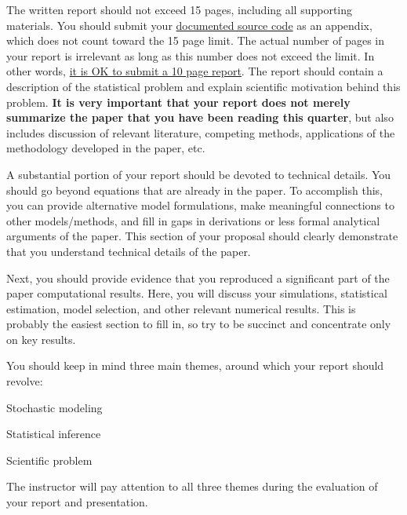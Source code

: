 \documentclass[12pt]{article} %
\newenvironment{itemize*}%
  {\begin{itemize}%
    \setlength{\itemsep}{0.01cm}%
    \setlength{\parskip}{0.02cm}%
    \setlength{\abovedisplayskip}{-0.12cm}%
    \setlength{\belowdisplayskip}{-0.12cm}}%
  {\end{itemize}}
\begin{document}
\par
The written report should not exceed 15 pages, including all supporting materials. You should 
submit your \underline{documented source code} as an appendix, 
which does not count toward the 15 page limit.
The actual number of pages in your report is irrelevant as long as this number does not exceed the 
limit. In other words, \underline{it is OK to submit a 10 page report}. 
The report should contain a description of the statistical problem and explain
scientific motivation behind this problem. \textbf{It is very important that your report does not merely
summarize the paper that you have been reading this quarter}, but also includes discussion of relevant
literature, competing methods, applications of the methodology developed in the paper, etc. 
\par
A substantial portion of your report should be devoted to technical details. You should go beyond 
equations that are already in the paper. To accomplish this, you can provide alternative model 
formulations, make meaningful connections to other models/methods, and fill in gaps in derivations or 
less formal analytical arguments of the paper. This section of your proposal should clearly demonstrate
that you understand technical details of the paper.
\par
Next, you should provide evidence that you reproduced a significant part of the paper computational
results. Here, you will discuss your simulations, statistical estimation, model selection, and 
other relevant numerical results. This is probably the easiest section to fill in, so try to be 
succinct and concentrate only on key results.
\vspace{0.4cm}
\par
\noindent
You should keep in mind three main themes, around which your report should revolve:
\begin{itemize*}
\item Stochastic modeling
\item Statistical inference
\item Scientific problem
\end{itemize*}
The instructor will pay attention to all three themes during the evaluation of your report and 
presentation.
\end{document}
